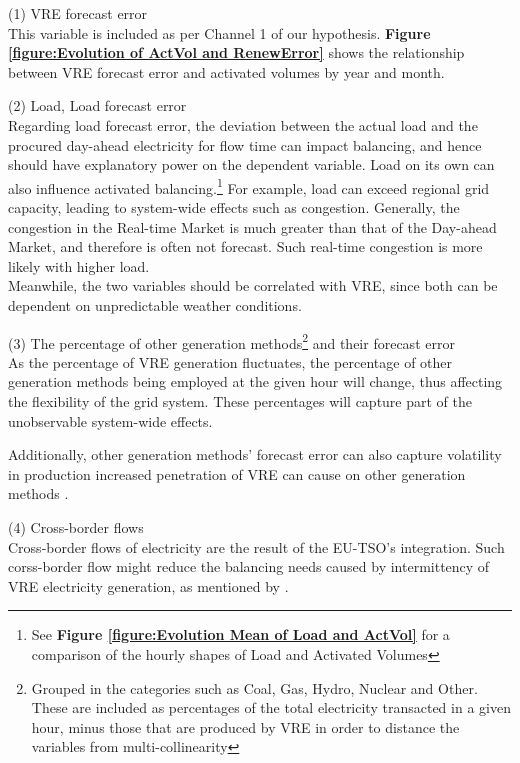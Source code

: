 \documentclass[12pt]{article}
\begin{document}
(1) VRE forecast error\\
This variable is included as per Channel 1 of our hypothesis. \textbf{Figure \ref{figure:Evolution of ActVol and RenewError}} shows the relationship between VRE forecast error and activated volumes by year and month.\par

(2) Load, Load forecast error\\
Regarding load forecast error, the deviation between the actual load and the procured day-ahead electricity for flow time can impact balancing, and hence should have explanatory power on the dependent variable. Load on its own can also influence activated balancing.\footnote{See \textbf{Figure \ref{figure:Evolution Mean of Load and ActVol}} for a comparison of the hourly shapes of Load and Activated Volumes} For example, load can exceed regional grid capacity, leading to system-wide effects such as congestion. Generally, the congestion in the Real-time Market is much greater than that of the Day-ahead Market, and therefore is often not forecast. Such real-time congestion is more likely with higher load.\\ Meanwhile, the two variables should be correlated with VRE, since both can be dependent on unpredictable weather conditions.  \par

(3) The percentage of other generation methods\footnote{Grouped in the categories such as Coal, Gas, Hydro, Nuclear and Other. These are included as percentages of the total electricity transacted in a given hour, minus those that are produced by VRE in order to distance the variables from multi-collinearity} and their forecast error\\
As the percentage of VRE generation fluctuates, the percentage of other generation methods being employed at the given hour will change, thus affecting the flexibility of the grid system. These percentages will capture part of the unobservable system-wide effects. \par
Additionally, other generation methods' forecast error can also capture volatility in production increased penetration of VRE can cause on other generation methods \citep{steen2014challenges}. 

(4) Cross-border flows\\
Cross-border flows of electricity are the result of the EU-TSO's integration. Such corss-border flow might reduce the balancing needs caused by intermittency of VRE electricity generation, as mentioned by \citet{Ocker2017}.\par
\end{document}
